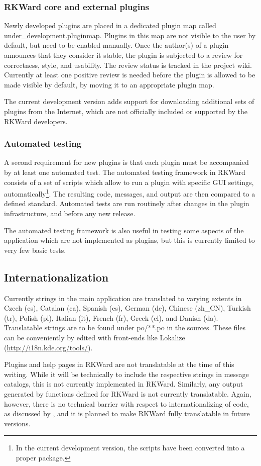 \subsubsection[technical_processes_plugins]{RKWard core and external plugins}
Newly developed plugins are placed in a dedicated plugin map called
under\_development.pluginmap. Plugins in this map are not visible to the user by
default, but need to be enabled manually. Once the author(s) of a plugin
announces that they consider it stable, the plugin is subjected to a review for
correctness, style, and usability. The review status is tracked in the project
wiki. Currently at least one positive review is needed before the plugin is
allowed to be made visible by default, by moving it to an appropriate plugin
map.

The current development version adds support for downloading additional sets of
plugins from the Internet, which are not officially included or supported by the
RKWard developers.

\subsubsection[technical_processes_automatedtesting]{Automated testing}
A second requirement for new plugins is that each plugin must be accompanied by
at least one automated test. The automated testing framework in RKWard consists
of a set of  scripts which allow to run a plugin with specific GUI settings,
automatically\footnote{
  In the current development version, the scripts have been converted into a proper
   package.
}. The resulting  code,  messages, and output are then compared
to a defined standard. Automated tests are run routinely after changes in the
plugin infrastructure, and before any new release.

The automated testing framework is also useful in testing some aspects of the
application which are not implemented as plugins, but this is currently limited
to very few basic tests.

\subsection[technical_internationalization]{Internationalization}
Currently strings in the main application are translated to varying extents in
Czech (cs), Catalan (ca), Spanish (es), German (de), Chinese (zh\_CN), Turkish
(tr), Polish (pl), Italian (it), French (fr), Greek (el), and Danish (da).
Translatable strings are to be found under po/**.po in the sources. These files
can be conveniently by edited with front-ends like Lokalize
(\url{http://i18n.kde.org/tools/}). 

Plugins and help pages in RKWard are not translatable at the time of this
writing. While it will be technically to include the respective strings in
message catalogs, this is not currently implemented in RKWard. Similarly, any
output generated by  functions defined for RKWard is not currently
translatable. Again, however, there is no technical barrier with respect to
internationalizing of  code, as discussed by \cite{Ripley2005a},
and it is planned to make RKWard fully translatable in future versions.
